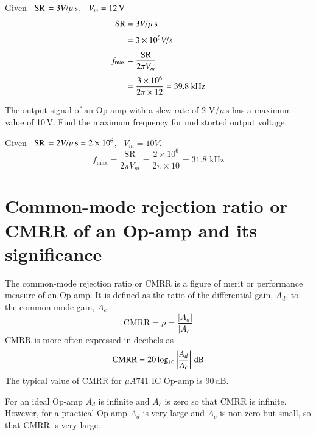 \begin{solution}
Given \ $\text{SR\,}=3V/\mu\text{\,s}$, \ $V_{m}=12\text{\,V}$
\begin{align*}
\text{SR} &=3V/\mu\text{\,s}\\[3pt]
&=3\times 10^{6}V/\text{s}\\[3pt]
f_{\max} &=\frac{\text{SR}}{2\pi V_{m}}\\[3pt]
&=\frac{3\times 10^{6}}{2\pi \times 12}=39.8\text{~kHz}
\end{align*}
\vskip -1cm
\end{solution}

\begin{example}\label{exam5.3}
The output signal of an Op-amp with a slew-rate of 2 V/$\mu$\,s has a maximum value of 10\,V. Find the maximum frequency for undistorted output voltage.
\end{example}

\begin{solution}
Given \ $\text{SR}\,=2V/\mu\text{\,s}=2\times 10^{6}$, \ $V_{m}=10V$.
$$
f_{\max}=\frac{\text{SR}}{2\pi V_{m}}=\frac{2\times 10^{6}}{2\pi\times 10}=31.8\text{~kHz}
$$
\vskip -1cm
\end{solution}

\eject

\section{Common-mode rejection ratio or CMRR of an Op-amp and its significance}\label{sec5.5}

The common-mode rejection ratio or CMRR is a figure of merit or performance measure of an Op-amp. It is defined as the ratio of the differential gain, $A_{d}$, to the common-mode gain, $A_{c}$.
\begin{equation}
\text{CMRR}=\rho=\frac{|A_{d}|}{|A_{c}|}\label{eq5.13}
\end{equation}
CMRR is more often expressed in decibels as
\begin{equation}
\text{CMRR}=20\log_{10}\left|\frac{A_{d}}{A_{c}}\right|\text{\,dB}\label{eq5.14}
\end{equation}
The typical value of CMRR for $\mu A741$ IC Op-amp is 90\,dB.

For an ideal Op-amp $A_{d}$ is infinite and $A_{c}$ is zero so that CMRR is infinite. However, for a practical Op-amp $A_{d}$ is very large and $A_{c}$ is non-zero but small, so that CMRR is very large.

